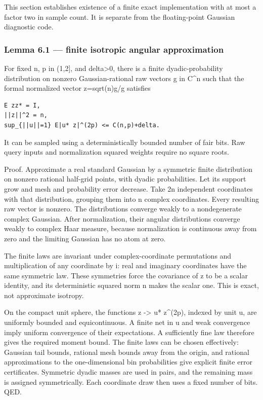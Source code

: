 \documentclass[
  10pt,
]{article}
\begin{document}
This section establishes existence of a finite exact implementation with
at most a factor two in sample count. It is separate from the
floating-point Gaussian diagnostic code.

\subsubsection{Lemma 6.1 --- finite isotropic angular
approximation}\label{lemma-6.1-finite-isotropic-angular-approximation}

For fixed n, p in (1,2{]}, and delta\textgreater0, there is a finite
dyadic-probability distribution on nonzero Gaussian-rational raw vectors
g in C\^{}n such that the formal normalized vector
z=sqrt(n)g/\textbar\textbar g\textbar\textbar{} satisfies

\begin{verbatim}
E zz* = I,
||z||^2 = n,
sup_{||u||=1} E|u* z|^(2p) <= C(n,p)+delta.
\end{verbatim}

It can be sampled using a deterministically bounded number of fair bits.
Raw query inputs and normalization squared weights require no square
roots.

Proof. Approximate a real standard Gaussian by a symmetric finite
distribution on nonzero rational half-grid points, with dyadic
probabilities. Let its support grow and mesh and probability error
decrease. Take 2n independent coordinates with that distribution,
grouping them into n complex coordinates. Every resulting raw vector is
nonzero. The distributions converge weakly to a nondegenerate complex
Gaussian. After normalization, their angular distributions converge
weakly to complex Haar measure, because normalization is continuous away
from zero and the limiting Gaussian has no atom at zero.

The finite laws are invariant under complex-coordinate permutations and
multiplication of any coordinate by i: real and imaginary coordinates
have the same symmetric law. These symmetries force the covariance of z
to be a scalar identity, and its deterministic squared norm n makes the
scalar one. This is exact, not approximate isotropy.

On the compact unit sphere, the functions z -\textgreater{} \textbar u*
z\textbar\^{}(2p), indexed by unit u, are uniformly bounded and
equicontinuous. A finite net in u and weak convergence imply uniform
convergence of their expectations. A sufficiently fine law therefore
gives the required moment bound. The finite laws can be chosen
effectively: Gaussian tail bounds, rational mesh bounds away from the
origin, and rational approximations to the one-dimensional bin
probabilities give explicit finite error certificates. Symmetric dyadic
masses are used in pairs, and the remaining mass is assigned
symmetrically. Each coordinate draw then uses a fixed number of bits.
QED.
\end{document}
